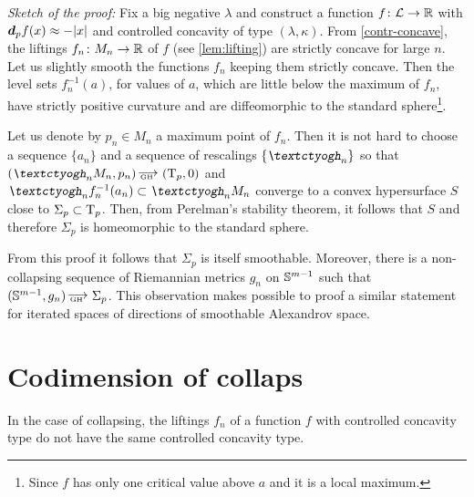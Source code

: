 \bigskip
\noi\textit{Sketch of the proof:}
Fix a big negative $\lambda$ and construct a function $f\:\spc{L}\to\RR$ with $\d_p
f(x)\approx -|x|$ and controlled concavity of type $(\lambda,\kappa)$.
From  \ref{contr-concave}, the liftings  $f_n\:M_n\to\RR$ of  $f$ (see
\ref{lem:lifting}) are strictly concave for large $n$.
Let us slightly smooth the functions $f_n$ keeping them strictly concave.
Then the level sets $f^{-1}_n(a)$, for values of $a$, which are little below the maximum of $f_n$,
have strictly positive curvature and are diffeomorphic to the standard
sphere\footnote{Since $f$ has only one critical value above $a$ and it is a local maximum.}.

Let us denote by $p_n\in M_n$ a maximum point of $f_n$.
Then it is not hard to choose a sequence $\{a_n\}$ and a sequence of rescalings
$\{\lam_n\}$ so that $(\lam_n M_n,p_n)\GHto (\T_p,0)$ and $\lam_n f^{-1}_n(a_n)\subset \lam_n M_n$ converge to a
convex hypersurface $S$ close to $\Sigma_p\subset \T_p$.
Then, from Perelman's stability theorem, it follows that $S$ and therefore $\Sigma_p$
is homeomorphic to the standard sphere.
\qeds

 From this proof it follows that $\Sigma_p$ is
itself smoothable. 
Moreover, there is a non-collapsing sequence of Riemannian metrics $g_n$ on $\mathbb{S}^{m-1}$ such that $(\SS^{m-1},g_n)\GHto\Sigma_p$. 
This observation makes possible to proof a similar statement for iterated spaces of directions of smoothable Alexandrov space.

\section{Codimension of collaps}

In the case of collapsing, the liftings $f_n$ of a function $f$ with controlled concavity
type do not have the same controlled concavity type.

